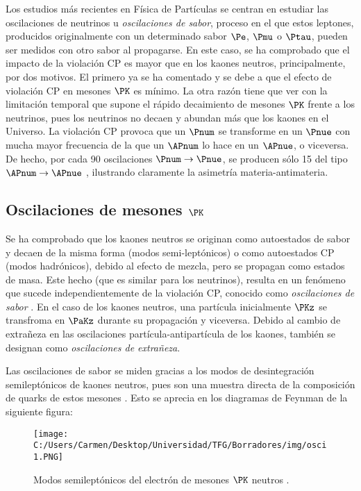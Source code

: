 Los estudios más recientes en Física de Partículas se centran en estudiar las oscilaciones de neutrinos u \textit{oscilaciones de sabor}, proceso en el que estos leptones, producidos originalmente con un determinado sabor $\Pe$, $\Pmu$ o $\Ptau$, pueden ser medidos con otro sabor al propagarse. En este caso, se ha comprobado que el impacto de la violación CP es mayor que en los kaones neutros, principalmente, por dos motivos. El primero ya se ha comentado y se debe a que el efecto de violación CP en mesones $\PK$ es mínimo. La otra razón tiene que ver con la limitación temporal que supone el rápido decaimiento de mesones $\PK$ frente a los neutrinos, pues los neutrinos no decaen y abundan más que los kaones en el Universo. La violación CP provoca que un $\Pnum$ se transforme en un $\Pnue$ con mucha mayor frecuencia de la que un $\APnum$ lo hace en un $\APnue$, o viceversa. De hecho, por cada 90 oscilaciones $\Pnum\rightarrow\Pnue$, se producen sólo 15 del tipo $\APnum\rightarrow\APnue$ \cite{T2K}, ilustrando claramente la asimetría materia-antimateria.
\vspace{3mm}

\subsection{Oscilaciones de mesones $\PK$}\label{sec:kaon_oscillations}
Se ha comprobado que los kaones neutros se originan como autoestados de sabor y decaen de la misma forma (modos semi-leptónicos) o como autoestados CP (modos hadrónicos), debido al efecto de mezcla, pero se propagan como estados de masa. Este hecho (que es similar para los neutrinos), resulta en un fenómeno que sucede independientemente de la violación CP, conocido como \textit{oscilaciones de sabor} \cite{Thomson}. En el caso de los kaones neutros, una partícula inicialmente $\PKz$ se transfroma en $\PaKz$ durante su propagación y viceversa. Debido al cambio de extrañeza en las oscilaciones partícula-antipartícula de los kaones, también se designan como \textit{oscilaciones de extrañeza}.

Las oscilaciones de sabor se miden gracias a los modos de desintegración semileptónicos de kaones neutros, pues son una muestra directa de la composición de quarks de estos mesones \cite{Thomson}. Esto se aprecia en los diagramas de Feynman de la siguiente figura:
\begin{figure}[!ht]
	\centering
	\texttt{[image: C:/Users/Carmen/Desktop/Universidad/TFG/Borradores/img/osci1.PNG]}
	\caption[Modos semileptónicos del electrón de mesones $\PK$ neutros]
	{Modos semileptónicos del electrón de mesones $\PK$ neutros \cite{Thomson}.}
	\label{fig:oscillation1}
\end{figure}

